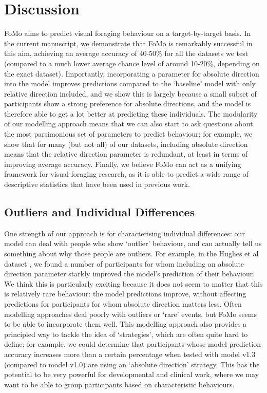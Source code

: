 \documentclass[man, floatsintext]{apa7}
\begin{document}
\section{Discussion}

FoMo aims to predict visual foraging behaviour on a target-by-target basis. In the current manuscript, we demonstrate that FoMo is remarkably successful in this aim, achieving an average accuracy of 40-50\% for all the datasets we test (compared to a much lower average chance level of around 10-20\%, depending on the exact dataset). Importantly, incorporating a parameter for absolute direction into the model improves predictions compared to the `baseline' model with only relative direction included, and we show this is largely because a small subset of participants show a strong preference for absolute directions, and the model is therefore able to get a lot better at predicting these individuals. The modularity of our modelling approach means that we can also start to ask questions about the most parsimonious set of parameters to predict behaviour: for example, we show that for many (but not all) of our datasets, including absolute direction means that the relative direction parameter is redundant, at least in terms of improving average accuracy. Finally, we believe FoMo can act as a unifying framework for visual foraging research, as it is able to predict a wide range of descriptive statistics that have been used in previous work.

\subsection{Outliers and Individual Differences}

One strength of our approach is for characterising individual differences: our model can deal with people who show `outlier' behaviour, and can actually tell us something about why those people are outliers. For example, in the Hughes et al dataset \cite{hughes2024}, we found a number of participants for whom including an absolute direction parameter starkly improved the model's prediction of their behaviour. We think this is particularly exciting because it does not seem to matter that this is relatively rare behaviour: the model predictions improve, without affecting predictions for participants for whom absolute direction matters less. Often modelling approaches deal poorly with outliers or `rare' events, but FoMo seems to be able to incorporate them well. This modelling approach also provides a principled way to tackle the idea of `strategies', which are often quite hard to define: for example, we could determine that participants whose model prediction accuracy increases more than a certain percentage when tested with model v1.3 (compared to model v1.0) are using an `absolute direction' strategy. This has the potential to be very powerful for developmental and clinical work, where we may want to be able to group participants based on characteristic behaviours.
\end{document}
